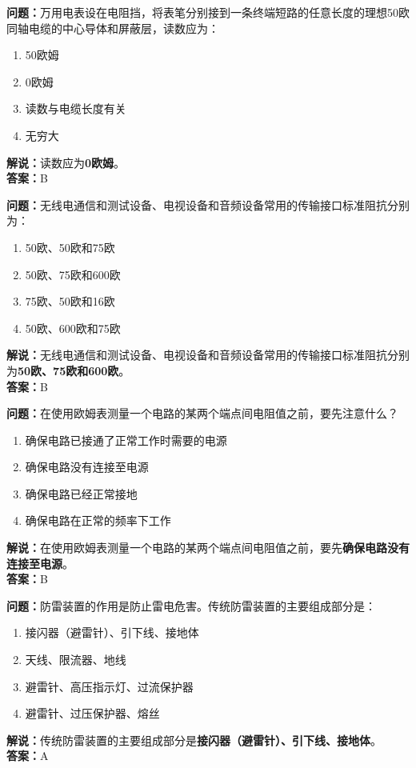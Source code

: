 \bigskip



\noindent\textbf{问题：}万用电表设在电阻挡，将表笔分别接到一条终端短路的任意长度的理想50欧同轴电缆的中心导体和屏蔽层，读数应为：
\begin{enumerate}[label=\Alph*), leftmargin=3em]
	\item 50欧姆
	\item 0欧姆
	\item 读数与电缆长度有关
	\item 无穷大
\end{enumerate}
\noindent\textbf{解说：}读数应为\textbf{0欧姆}。\\\noindent\textbf{答案：}B


\bigskip



\noindent\textbf{问题：}无线电通信和测试设备、电视设备和音频设备常用的传输接口标准阻抗分别为：
\begin{enumerate}[label=\Alph*), leftmargin=3em]
	\item 50欧、50欧和75欧
	\item 50欧、75欧和600欧
	\item 75欧、50欧和16欧
	\item 50欧、600欧和75欧
\end{enumerate}
\noindent\textbf{解说：}无线电通信和测试设备、电视设备和音频设备常用的传输接口标准阻抗分别为\textbf{50欧、75欧和600欧}。\\\noindent\textbf{答案：}B


\bigskip



\noindent\textbf{问题：}在使用欧姆表测量一个电路的某两个端点间电阻值之前，要先注意什么？
\begin{enumerate}[label=\Alph*), leftmargin=3em]
	\item 确保电路已接通了正常工作时需要的电源
	\item 确保电路没有连接至电源
	\item 确保电路已经正常接地
	\item 确保电路在正常的频率下工作
\end{enumerate}
\noindent\textbf{解说：}在使用欧姆表测量一个电路的某两个端点间电阻值之前，要先\textbf{确保电路没有连接至电源}。\\\noindent\textbf{答案：}B


\bigskip



\noindent\textbf{问题：}防雷装置的作用是防止雷电危害。传统防雷装置的主要组成部分是：
\begin{enumerate}[label=\Alph*), leftmargin=3em]
	\item 接闪器（避雷针）、引下线、接地体
	\item 天线、限流器、地线
	\item 避雷针、高压指示灯、过流保护器
	\item 避雷针、过压保护器、熔丝
\end{enumerate}
\noindent\textbf{解说：}传统防雷装置的主要组成部分是\textbf{接闪器（避雷针）、引下线、接地体}。\\\noindent\textbf{答案：}A


